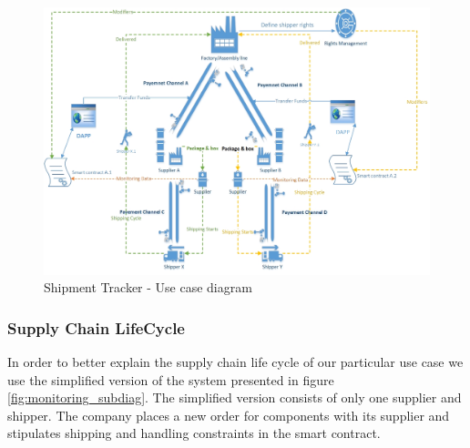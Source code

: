 \begin{figure}[h]
	\centering
    \includegraphics[width=180mm,scale=3]{figs/UseCase}
	\caption{Shipment Tracker - Use case diagram}
	\label{fig:UseCase}
\end{figure}

\clearpage


\subsubsection{Supply Chain LifeCycle}
In order to better explain the supply chain life cycle of our particular use case we use the simplified version of the system presented in figure \ref{fig:monitoring_subdiag}. The simplified version consists of only one supplier and shipper. The company places a new order for components with its supplier and stipulates shipping and handling constraints in the smart contract. 

